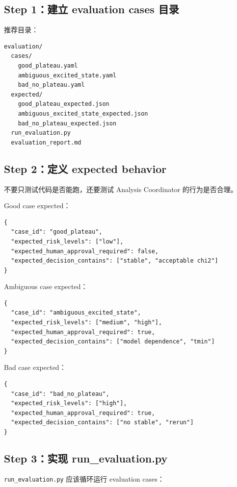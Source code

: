 \documentclass[11pt,a4paper,fontset=none]{ctexart}
\begin{document}
\subsection{Step 1：建立 evaluation cases 目录}

推荐目录：

\begin{lstlisting}
evaluation/
  cases/
    good_plateau.yaml
    ambiguous_excited_state.yaml
    bad_no_plateau.yaml
  expected/
    good_plateau_expected.json
    ambiguous_excited_state_expected.json
    bad_no_plateau_expected.json
  run_evaluation.py
  evaluation_report.md
\end{lstlisting}

\subsection{Step 2：定义 expected behavior}

不要只测试代码是否能跑，还要测试 Analysis Coordinator 的行为是否合理。

Good case expected：

\begin{lstlisting}
{
  "case_id": "good_plateau",
  "expected_risk_levels": ["low"],
  "expected_human_approval_required": false,
  "expected_decision_contains": ["stable", "acceptable chi2"]
}
\end{lstlisting}

Ambiguous case expected：

\begin{lstlisting}
{
  "case_id": "ambiguous_excited_state",
  "expected_risk_levels": ["medium", "high"],
  "expected_human_approval_required": true,
  "expected_decision_contains": ["model dependence", "tmin"]
}
\end{lstlisting}

Bad case expected：

\begin{lstlisting}
{
  "case_id": "bad_no_plateau",
  "expected_risk_levels": ["high"],
  "expected_human_approval_required": true,
  "expected_decision_contains": ["no stable", "rerun"]
}
\end{lstlisting}

\subsection{Step 3：实现 run\_evaluation.py}

\texttt{run\_evaluation.py} 应该循环运行 evaluation cases：
\end{document}
